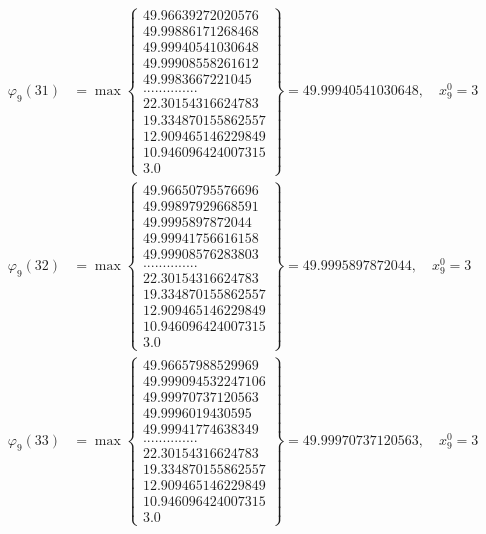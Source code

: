 \documentclass{article}
\begin{document}
\begin{align*}
  
  
  
\varphi_{9}(31) &= \max \left\{ \begin{array}{c}
49.96639272020576 \\
 49.99886171268468 \\
 49.99940541030648 \\
 49.99908558261612 \\
 49.9983667221045 \\
 .............. \\
 22.30154316624783 \\
 19.334870155862557 \\
 12.909465146229849 \\
 10.946096424007315 \\
 3.0
\end{array} \right\} = 49.99940541030648, \quad x_{9}^0 = 3\\
  
  
  
  
\varphi_{9}(32) &= \max \left\{ \begin{array}{c}
49.96650795576696 \\
 49.99897929668591 \\
 49.9995897872044 \\
 49.99941756616158 \\
 49.99908576283803 \\
 .............. \\
 22.30154316624783 \\
 19.334870155862557 \\
 12.909465146229849 \\
 10.946096424007315 \\
 3.0
\end{array} \right\} = 49.9995897872044, \quad x_{9}^0 = 3\\
  
  
  
  
\varphi_{9}(33) &= \max \left\{ \begin{array}{c}
49.96657988529969 \\
 49.999094532247106 \\
 49.99970737120563 \\
 49.9996019430595 \\
 49.99941774638349 \\
 .............. \\
 22.30154316624783 \\
 19.334870155862557 \\
 12.909465146229849 \\
 10.946096424007315 \\
 3.0
\end{array} \right\} = 49.99970737120563, \quad x_{9}^0 = 3\\
  

\end{align*}
\end{document}
